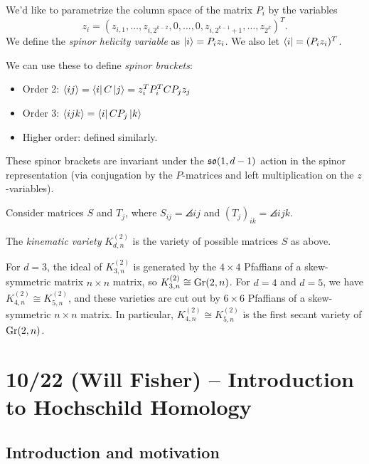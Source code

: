 \documentclass{amsart}
\begin{document}
We'd like to parametrize the column space of the matrix $P_i$ by the variables 
\[
	z_i = (z_{i,1}, \dots, z_{i,2^{k-2}}, 0, \dots, 0, z_{i,2^{k-1}+1}, \dots, z_{2^k})^T.
\]
We define the \emph{spinor helicity variable} as $\left| {i} \right\rangle = P_i z_i$.
We also let $\left\langle {i} \right| = (P_i z_i)^T$.

We can use these to define \emph{spinor brackets}:
\begin{itemize}
	\item Order 2: $\langle {ij} \rangle = \left\langle {i} \right| C \left| {j} \right\rangle = z_i^T P_i^T C P_j z_j$
	\item Order 3: $\langle {ijk} \rangle = \left\langle {i} \right| C P_j \left| {k} \right\rangle$
	\item Higher order: defined similarly.
\end{itemize}

\begin{thm}
	These spinor brackets are invariant under the $\mathfrak{so}(1, d-1)$ action in the spinor representation (via conjugation by the $P$-matrices and left multiplication on the $z$-variables).
\end{thm}

Consider matrices $S$ and $T_j$, where $S_{ij} = \angles{ij}$ and $(T_j)_{ik} = \angles{ijk}$.

\begin{dfn}
	The \emph{kinematic variety} $K_{d,n}^{(2)}$ is the variety of possible matrices $S$ as above.
\end{dfn}

\begin{thm}
	For $d = 3$, the ideal of $K_{3,n}^{(2)}$ is generated by the $4 \times 4$ Pfaffians of a skew-symmetric matrix $n \times n$ matrix, so $K_{3,n}^{(2)} \cong \operatorname{Gr}(2, n)$.
	For $d = 4$ and $d = 5$, we have $K_{4,n}^{(2)} \cong K_{5,n}^{(2)}$, and these varieties are cut out by $6 \times 6$ Pfaffians of a skew-symmetric $n \times n$ matrix.
	In particular, $K_{4,n}^{(2)} \cong K_{5,n}^{(2)}$ is the first secant variety of $\operatorname{Gr}(2, n)$.
\end{thm}

\section{10/22 (Will Fisher) -- Introduction to Hochschild Homology}

\subsection{Introduction and motivation}
\end{document}
